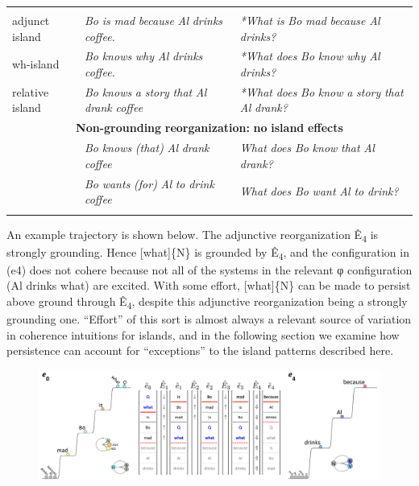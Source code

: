 \begin{tabularx}{\textwidth}{XXX}
\lsptoprule
\multicolumn{3}{c}{\textbf{Strongly} \textbf{grounding} \textbf{reorganization:} \textbf{island} \textbf{effects}}\\
adjunct island & \textit{Bo} \textit{is} \textit{mad} \textit{because} \textit{Al} \textit{drinks} \textit{coffee.} & \textit{*What} \textit{is} \textit{Bo} \textit{mad} \textit{because} \textit{Al} \textit{drinks?}\\
wh-island & \textit{Bo} \textit{knows} \textit{why} \textit{Al} \textit{drinks} \textit{coffee.} & \textit{*What} \textit{does} \textit{Bo} \textit{know} \textit{why} \textit{Al} \textit{drinks?}\\
relative island & \textit{Bo} \textit{knows} \textit{a} \textit{story} \textit{that} \textit{Al} \textit{drank} \textit{coffee} & \textit{*What} \textit{does} \textit{Bo} \textit{know} \textit{a} \textit{story} \textit{that} \textit{Al} \textit{drank?}\\
\multicolumn{3}{c}{\textbf{Non-grounding} \textbf{reorganization:} \textbf{no} \textbf{island} \textbf{effects}}\\
& \textit{Bo} \textit{knows} \textit{(that)} \textit{Al} \textit{drank} \textit{coffee} & \textit{What} \textit{does} \textit{Bo} \textit{know} \textit{that} \textit{Al} \textit{drank?}\\
& \textit{Bo} \textit{wants} \textit{(for)} \textit{Al} \textit{to} \textit{drink} \textit{coffee} & \textit{What} \textit{does} \textit{Bo} \textit{want} \textit{Al} \textit{to} \textit{drink?}\\
\lspbottomrule
\end{tabularx}
  An example trajectory is shown below. The adjunctive reorganization Ê\textsubscript{4} is strongly grounding. Hence [what]\{N\} is grounded by Ê\textsubscript{4}, and the configuration in (e4) does not cohere because not all of the systems in the relevant φ configuration ({\textbar}Al drinks what{\textbar}) are excited. With some effort, [what]\{N\} can be made to persist above ground through Ê\textsubscript{4}, despite this adjunctive reorganization being a strongly grounding one. “Effort” of this sort is almost always a relevant source of variation in coherence intuitions for islands, and in the following section we examine how persistence can account for “exceptions” to the island patterns described here.

  
\begin{figure}
\includegraphics[width=\textwidth]{figures/Tilsen-img163.png}
\caption{\missingcaption}
\label{fig:}
\end{figure}
 

